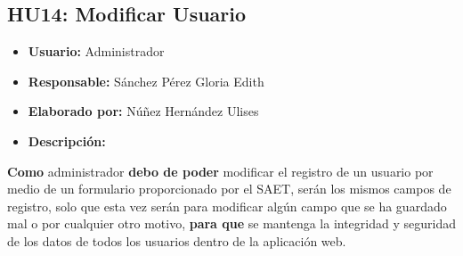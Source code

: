 \subsection{HU14: Modificar Usuario}
\begin{itemize}
	\item \textbf{Usuario:} Administrador
	\item \textbf{Responsable:} Sánchez Pérez Gloria Edith
	\item \textbf{Elaborado por:} Núñez Hernández Ulises
	\item \textbf{Descripción:}
\end{itemize}
\textbf{Como} administrador \textbf{debo de poder} modificar el registro de un usuario por medio de un formulario proporcionado por el SAET, serán los mismos campos de registro, solo que esta vez serán para modificar algún campo que se ha guardado mal o por cualquier otro motivo, \textbf{para que} se mantenga la integridad y seguridad de los datos de todos los usuarios dentro de la aplicación web. 